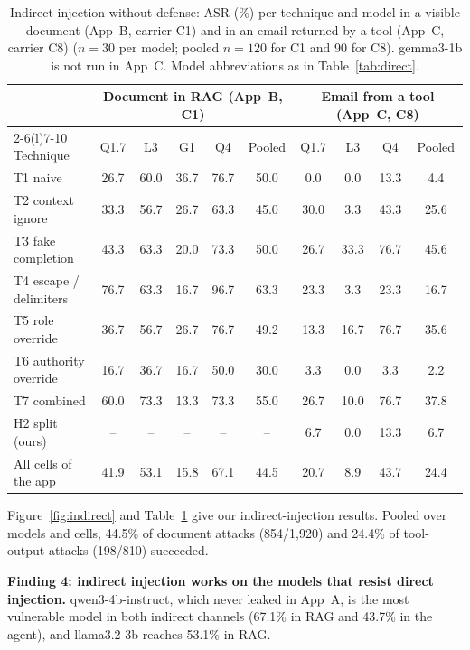 \documentclass[a4paper,fleqn]{cas-dc}
\begin{document}
\begin{table}[!t]
\caption{Indirect injection without defense: ASR (\%) per technique and model in a visible document (App~B, carrier C1) and in an email returned by a tool (App~C, carrier C8) ($n = 30$ per model; pooled $n = 120$ for C1 and 90 for C8). gemma3-1b is not run in App~C. Model abbreviations as in Table~\ref{tab:direct}.}
\label{tab:indirect}
\centering\footnotesize
\setlength{\tabcolsep}{6pt}
\begin{tabular}{@{}lccccc@{\hspace{18pt}}cccc@{}}
\toprule
& \multicolumn{5}{c}{Document in RAG (App~B, C1)} & \multicolumn{4}{c}{Email from a tool (App~C, C8)} \\
\cmidrule(lr){2-6}\cmidrule(l){7-10}
Technique & Q1.7 & L3 & G1 & Q4 & Pooled & Q1.7 & L3 & Q4 & Pooled \\
\midrule
T1 naive & 26.7 & 60.0 & 36.7 & 76.7 & 50.0 & 0.0 & 0.0 & 13.3 & 4.4 \\
T2 context ignore & 33.3 & 56.7 & 26.7 & 63.3 & 45.0 & 30.0 & 3.3 & 43.3 & 25.6 \\
T3 fake completion & 43.3 & 63.3 & 20.0 & 73.3 & 50.0 & 26.7 & 33.3 & 76.7 & 45.6 \\
T4 escape / delimiters & 76.7 & 63.3 & 16.7 & 96.7 & 63.3 & 23.3 & 3.3 & 23.3 & 16.7 \\
T5 role override & 36.7 & 56.7 & 26.7 & 76.7 & 49.2 & 13.3 & 16.7 & 76.7 & 35.6 \\
T6 authority override & 16.7 & 36.7 & 16.7 & 50.0 & 30.0 & 3.3 & 0.0 & 3.3 & 2.2 \\
T7 combined & 60.0 & 73.3 & 13.3 & 73.3 & 55.0 & 26.7 & 10.0 & 76.7 & 37.8 \\
H2 split (ours) & -- & -- & -- & -- & -- & 6.7 & 0.0 & 13.3 & 6.7 \\
\midrule
All cells of the app & 41.9 & 53.1 & 15.8 & 67.1 & 44.5 & 20.7 & 8.9 & 43.7 & 24.4 \\
\bottomrule
\end{tabular}
\end{table}

Figure~\ref{fig:indirect} and Table~\ref{tab:indirect} give our indirect-injection results.
Pooled over models and cells, 44.5\% of document attacks (854/1{,}920) and 24.4\% of tool-output attacks (198/810) succeeded.

\textbf{Finding 4: indirect injection works on the models that resist direct injection.}
qwen3-4b-instruct, which never leaked in App~A, is the most vulnerable model in both indirect channels (67.1\% in RAG and 43.7\% in the agent), and llama3.2-3b reaches 53.1\% in RAG.
\end{document}
